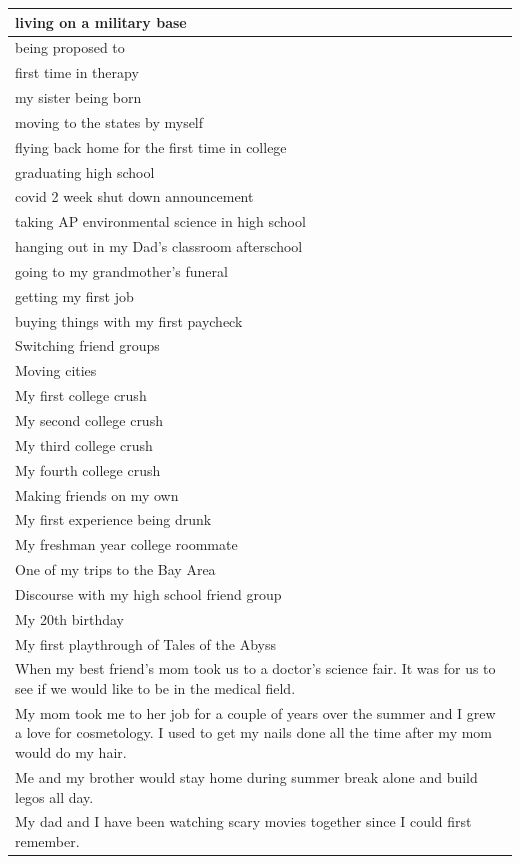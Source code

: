 \documentclass[
  .7em,
  letterpaper,
  DIV=11,
  numbers=noendperiod]{scrartcl}
\begin{document}
\begin{table}
\begin{tabular}{l}
\hline
living on a military base\\
\hline
being proposed to\\
\hline
first time in therapy\\
\hline
my sister being born\\
\hline
moving to the states by myself\\
\hline
flying back home for the first time in college\\
\hline
graduating high school\\
\hline
covid 2 week shut down announcement\\
\hline
taking AP environmental science in high school\\
\hline
hanging out in my Dad’s classroom afterschool\\
\hline
going to my grandmother’s funeral\\
\hline
getting my first job\\
\hline
buying things with my first paycheck\\
\hline
Switching friend groups\\
\hline
Moving cities\\
\hline
My first college crush\\
\hline
My second college crush\\
\hline
My third college crush\\
\hline
My fourth college crush\\
\hline
Making friends on my own\\
\hline
My first experience being drunk\\
\hline
My freshman year college roommate\\
\hline
One of my trips to the Bay Area\\
\hline
Discourse with my high school friend group\\
\hline
My 20th birthday\\
\hline
My first playthrough of Tales of the Abyss\\
\hline
When my best friend's mom took us to a doctor's science fair. It was for us to see if we would like to be in the medical field.\\
\hline
My mom took me to her job for a couple of years over the summer and I grew a love for cosmetology. I used to get my nails done all the time after my mom would do my hair.\\
\hline
Me and my brother would stay home during summer break alone and build legos all day.\\
\hline
My dad and I have been watching scary movies together since I could first remember.\\

\end{tabular}
\end{table}
\end{document}
